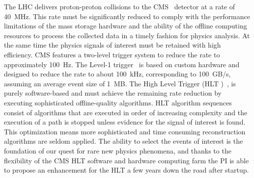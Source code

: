 \documentclass{JINST}
\begin{document}
The LHC delivers proton-proton collisions to the CMS~\cite{bib:TP} detector at a rate of 40~MHz. This rate
must be significantly reduced to comply with the performance limitations of the mass storage hardware and the ability
of the offline computing resources to process the collected data in a timely fashion for physics analysis. At the same
time the physics signals of interest must be retained with high efficiency. CMS features a two-level trigger system to reduce
the rate to approximately 100~Hz. The Level-1 trigger~\cite{bib:TDR1} is based on custom hardware and designed to reduce the rate
to about 100~kHz, corresponding to 100~GB/s, assuming an average event size of 1~MB. The High Level Trigger (HLT )~\cite{bib:TDR2},\cite{bib:HLT}
is purely software-based and must achieve the remaining rate reduction by executing sophisticated offline-quality algorithms.
HLT algorithm sequences consist of algorithms that are executed in order of increasing complexity and
the execution of a path is stopped unless evidence for the signal of interest is found. This optimization means more sophisticated and time
consuming reconstruction algorithms are seldom applied. The ability to select the events of interest is the foundation of our 
quest for rare new physics phenomena, and thanks to the flexibility of the CMS HLT software and hardware computing farm the PI is able 
to propose an enhancement for the HLT a few years down the road after startup.
\end{document}
